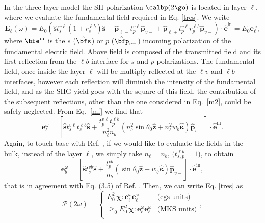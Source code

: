 In the three layer model the SH polarization $\calbp(2\go)$ is located in layer $\ell$,
where we evaluate the fundamental field required in Eq. \eqref{tres}.
We write
\begin{equation}\label{m2}
\mathbf{E}_{\ell}(\omega)=E_0\left(
\hat{\mathbf{s}} t^{v\ell}_s(1+r^{\ell b}_s)\hat{\mathbf{s}}
+
\hat{\mathbf{p}}_{\ell-}
 t^{v\ell}_{p}
\hat{\mathbf{p}}_{v-}
+
\hat{\mathbf{p}}_{\ell+}
t^{v\ell}_{p}r^{\ell b}_{p}
\hat{\mathbf{p}}_{v-}
\right)\cdot\hat{\mathbf{e}}^{\mathrm{in}}=E_0\mathbf{e}^\omega_{\ell}
,
\end{equation} 
where $\bfe^{\mathrm{in}}$ is the $s$ ($\hat\bfs$) or $p$
($\hat\bfp_{v-}$)
incoming polarization of
the fundamental electric field. 
Above field is composed of the transmitted field and its first
reflection from the $\ell b$ interface for $s$ and $p$ polarizations.
The fundamental field, once inside the layer $\ell$ will be multiply
reflected at the $\ell v$ and $\ell b$ interfaces, however each
reflection will diminish the intensity of the fundamental field, and as the SHG
yield goes with the square of this field, the contribution of the
subsequent reflections, other than the one considered in
Eq.~\eqref{m2},  could be safely neglected.
From Eq.~\eqref{mf}
we find that
\begin{equation}\label{m12}
\mathbf{e}^{\omega}_{\ell}
= \left[
\hat{\mathbf{s}}t_{s}^{v\ell}t_{s}^{\ell b}\hat{\mathbf{s}} 
+ \frac{t^{v\ell}_{p}t^{\ell b}_{p}}
       {n^2_\ell n_b}
\left(
  n^2_b
\sin\theta_0\hat{\mathbf{z}}
+ n^2_\ell w_b\hat{\boldsymbol{\kappa}}
\right)
\hat{\mathbf{p}}_{v-}
\right]
\cdot\hat{\mathbf{e}}^{\mathrm{in}}.  
\end{equation}  
Again, to touch base with Ref. \cite{mizrahiJOSA88},
if we would like to evaluate the fields in the bulk, instead of the layer
$\ell$, we simply take 
$n_\ell=n_b,\,(t^{\ell b}_{s,p}=1$), to obtain
\begin{equation}\label{m13}
\mathbf{e}^{\omega}_{b}
= \left[
\hat{\mathbf{s}}t_{s}^{vb}\hat{\mathbf{s}}
+ \frac{t^{vb}_{p}}{n_b}
\left(
\sin\theta_0\hat{\mathbf{z}} + w_b\hat{\boldsymbol{\kappa}}
\right) 
\hat{\mathbf{p}}_{v-}
\right]
\cdot\hat{\mathbf{e}}^{\mathrm{in}},  
\end{equation} 
that is in agreement with Eq. (3.5) of Ref. \cite{mizrahiJOSA88}.
Then,
 we can write Eq. \eqref{tres} as
\begin{equation}\label{m4}
\boldsymbol{\mathcal{P}}(2\omega) = 
\left\{
\begin{array}{cc}  
E^{2}_{0}\,\boldsymbol{\chi}:\mathbf{e}^{\omega}_{\ell}\mathbf{e}^{\omega}_{\ell}
& \text{(cgs units)} \\
\ge_0E^{2}_{0}\,\boldsymbol{\chi}:\mathbf{e}^{\omega}_{\ell}\mathbf{e}^{\omega}_{\ell}
& \text{(MKS units)} \\
\end{array}
\right.
,
\end{equation}
